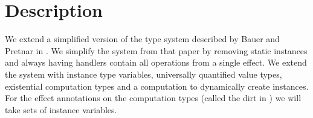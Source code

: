 
\newcommand\Eff[0]{E}
\newcommand\eff[0]{\varepsilon}
\newcommand\Op[0]{O}
\newcommand\op[0]{op}
\newcommand\inst[0]{\iota}

\newcommand\pty[1]{\ty^1_{#1}}
\newcommand\rty[1]{\ty^2_{#1}}

\newcommand\ty[0]{\tau}
\newcommand\tunit[0]{()}
\newcommand\tarr[2]{#1 \rightarrow #2}
\newcommand\thandler[2]{#1 \Rightarrow #2}
\newcommand\tforall[3]{\forall(#1:#2) . #3}

\newcommand\cty[0]{\underline{\ty}}
\newcommand\aty[2]{#1 \; ! \; #2}
\newcommand\texists[3]{\exists(#1:#2) . #3}
\newcommand\texistss[2]{\exists \overrightarrow{#1} . #2}

\newcommand\val[0]{\nu}
\newcommand\vunit[0]{()}
\newcommand\vinst[1]{\mathsf{inst}(#1)}
\newcommand\vabst[3]{\Lambda(#1:#2) . #3}
\newcommand\vabs[2]{\lambda #1 . #2}
\newcommand\vappt[2]{#1 \; [ #2 ]}
\newcommand\vhandler[1]{\textit{handler} \; \{#1\}}
\newcommand\vhandleri[2]{\textit{handler} ( #1 ) \; \{#2\}}
\newcommand\vhandlerc[0]{\vhandler{
	\textit{return} \; x \rightarrow \comp,
	\op_1(x ; k) \rightarrow \comp,
	...,
	\op_n(x ; k) \rightarrow \comp
}}
\newcommand\vhandlerci[1]{\vhandleri{#1}{
	\textit{return} \; x \rightarrow \comp,
	\op_1(x ; k) \rightarrow \comp,
	...,
	\op_n(x ; k) \rightarrow \comp
}}

\newcommand\comp[0]{c}
\newcommand\creturn[1]{\textit{return} \; #1}
\newcommand\capp[2]{#1 \; #2}
\newcommand\cdo[3]{#1 \leftarrow #2 ; #3}
\newcommand\cop[4]{#1(#2 ; #3 . #4)}
\newcommand\copi[5]{#1 \# #2(#3 ; #4 . #5)}
\newcommand\chandle[2]{\textit{with} \; #1 \; \textit{handle} \; #2}
\newcommand\cnew[1]{\textit{new} \; #1}
\newcommand\cunpack[4]{(#1, #2) \leftarrow #3 ; #4}

\newcommand\subty[2]{#1 <: #2}
\newcommand\sep[0]{\;;\;}

\section{Description}
We extend a simplified version of the type system described by Bauer and Pretnar in \cite{effectsystem}.
We simplify the system from that paper by removing static instances and always having handlers contain all operations from a single effect.
We extend the system with instance type variables,  universally quantified value types, existential computation types and a computation to dynamically create instances.
For the effect annotations on the computation types (called the dirt in \cite{effectsystem}) we will take sets of instance variables. 

